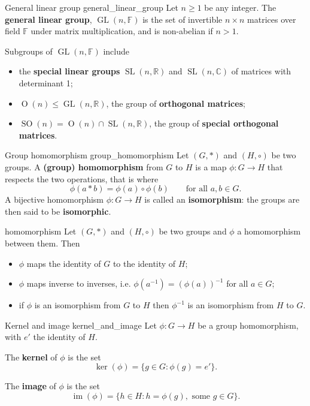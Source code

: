 \begin{definition}{General linear group \cite{math2601_notes}}{general_linear_group}
Let $n \geq 1$ be any integer. The \textbf{general linear group}, $\operatorname{GL}(n, \mathbb{F})$ is the set of invertible $n \times n$ matrices over field $\mathbb{F}$ under matrix multiplication, and is non-abelian if $n > 1$.
\end{definition}

Subgroups of $\operatorname{GL}(n, \mathbb{F})$ include
\begin{itemize}
	\item the \textbf{special linear groups} $\operatorname{SL}(n, \mathbb{R})$ and $\operatorname{SL}(n, \mathbb{C})$ of matrices with determinant 1;
	\item $\operatorname{O}(n) \leq \operatorname{GL}(n, \mathbb{R})$, the group of \textbf{orthogonal matrices};
	\item $\operatorname{SO}(n) = \operatorname{O}(n) \cap \operatorname{SL}(n, \mathbb{R})$, the group of \textbf{special orthogonal matrices}.
\end{itemize}

\begin{definition}{Group homomorphism \cite{math2601_notes}}{group_homomorphism}
Let $(G, *)$ and $(H, \circ)$ be two groups. A \textbf{(group) homomorphism} from $G$ to $H$ is a map $\phi : G \to H$ that respects the two operations, that is where
$$ \phi (a * b) = \phi (a) \circ \phi (b) \qquad \text{for all } a, b \in G . $$
A bijective homomorphism $\phi : G \to H$ is called an \textbf{isomorphism}: the groups are then said to be \textbf{isomorphic}.
\end{definition}

\begin{lemma}{\cite{math2601_notes}}{homomorphism}
Let $(G, *)$ and $(H, \circ)$ be two groups and $\phi$ a homomorphism between them. Then
\begin{itemize}
	\item $\phi$ maps the identity of $G$ to the identity of $H$;
	\item $\phi$	 maps inverse to inverses, i.e. $\phi (a^{-1}) = (\phi(a))^{-1}$ for all $a \in G$;
	\item if $\phi$ is an isomorphism from $G$ to $H$ then $\phi^{-1}$ is an isomorphism from $H$ to $G$.
\end{itemize}
\end{lemma}

\begin{definition}{Kernel and image \cite{math2601_notes}}{kernel_and_image}
Let $\phi : G \to H$ be a group homomorphism, with $e'$ the identity of $H$.

The \textbf{kernel} of $\phi$ is the set
$$ \ker (\phi) = \{ g \in G : \phi (g) = e' \} . $$

The \textbf{image} of $\phi$ is the set
$$ \operatorname{im} (\phi) = \{ h \in H : h = \phi (g), \text{ some } g \in G \} . $$
\end{definition}

